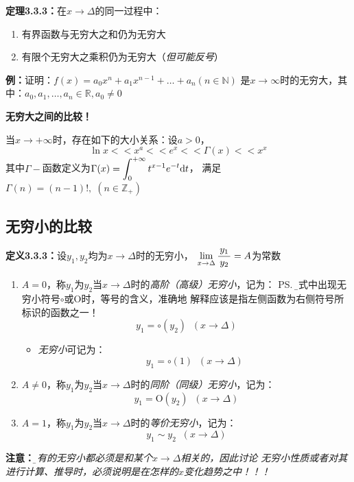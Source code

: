
{\bf 定理3.3.3：}在$x\to\Delta$的同一过程中：
\begin{enumerate}[(1)]
  \setlength{\itemindent}{1cm}
  \item 有界函数与无穷大之和仍为无穷大
  \item 有限个无穷大之乘积仍为无穷大（{\it 但可能反号}）
\end{enumerate}

{\bf 例：}证明：$f(x)=a_0x^n+a_1x^{n-1}+\ldots+a_n(n\in\mathbb{N})$
是$x\to\infty$时的无穷大，其中：$a_0,a_1,\ldots,a_n\in\mathbb{R},a_0\ne 0$

\begin{shaded}
	{\bf 无穷大之间的比较！}
	
	当$x\to+\infty$时，存在如下的大小关系：设$a>0$，
	$$\ln x<<x^a<<e^x<<\Gamma(x)<<x^x$$
	其中$\Gamma-$函数定义为$\Gamma(x)=\displaystyle\int_0^{+\infty}t^{x-1}e^{-t}\mathrm{d} t$，
	满足$\Gamma(n)=(n-1)!,\;(n\in\mathbb{Z}_+)$
\end{shaded}

\subsection{无穷小的比较}

{\bf 定义3.3.3：}设$y_1,y_2$均为$x\to\Delta$时的无穷小，
$\lim\limits_{x\to{\Delta}}\displaystyle\frac{\,{y_1}\,}{\,{y_2}\,}=A$为常数
\begin{enumerate}[(1)]
  \setlength{\itemindent}{1cm}
  \item $A=0$，称$y_1$为$y_2$当$x\to\Delta$时的{\it 高阶（高级）无穷小}，记为：
  \ps{\b 等式中出现无穷小符号$\circ$或$\mathrm{O}$时，等号的含义，准确地
  解释应该是指左侧函数为右侧符号所标识的函数之一！}
  $$y_1=\circ( y_2)\;\;(x\to\Delta)$$
  \begin{itemize}
    \item {\it 无穷小}可记为：
    $$y_1=\circ(1)\;\;(x\to\Delta)$$
  \end{itemize}
  \item $A\ne 0$，称$y_1$为$y_2$当$x\to\Delta$时的{\it 同阶（同级）无穷小}，记为：
  $$y_1=\mathrm{O}( y_2)\;\;(x\to\Delta)$$
  \item $A=1$，称$y_1$为$y_2$当$x\to\Delta$时的{\it 等价无穷小}，记为：
  $$y_1\sim y_2\;\;(x\to\Delta)$$
\end{enumerate}

{\bf 注意：}{\it\b 所有的无穷小都必须是和某个$x\to\Delta$相关的，因此讨论
无穷小性质或者对其进行计算、推导时，必须说明是在怎样的$x$变化趋势之中！！！}

